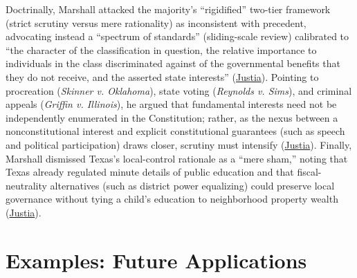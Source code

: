 \documentclass[12pt]{article}
\begin{document}
Doctrinally, Marshall attacked the majority's ``rigidified'' two-tier framework (strict scrutiny versus mere rationality) as inconsistent with precedent, advocating instead a ``spectrum of standards'' (sliding-scale review) calibrated to ``the character of the classification in question, the relative importance to individuals in the class discriminated against of the governmental benefits that they do not receive, and the asserted state interests'' (\href{https://supreme.justia.com/cases/federal/us/411/1/}{Justia}). Pointing to procreation (\textit{Skinner v. Oklahoma}), state voting (\textit{Reynolds v. Sims}), and criminal appeals (\textit{Griffin v. Illinois}), he argued that fundamental interests need not be independently enumerated in the Constitution; rather, as the nexus between a nonconstitutional interest and explicit constitutional guarantees (such as speech and political participation) draws closer, scrutiny must intensify (\href{https://supreme.justia.com/cases/federal/us/411/1/}{Justia}). Finally, Marshall dismissed Texas's local-control rationale as a ``mere sham,'' noting that Texas already regulated minute details of public education and that fiscal-neutrality alternatives (such as district power equalizing) could preserve local governance without tying a child's education to neighborhood property wealth (\href{https://supreme.justia.com/cases/federal/us/411/1/}{Justia}).

\section{Examples: Future Applications}
\end{document}
